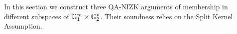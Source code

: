 In this section we construct three QA-NIZK arguments of membership in different subspaces of $\mathbb{G}^{m}_1 \times \mathbb{G}^{n}_2$. Their soundness relies on the Split Kernel Assumption. 

